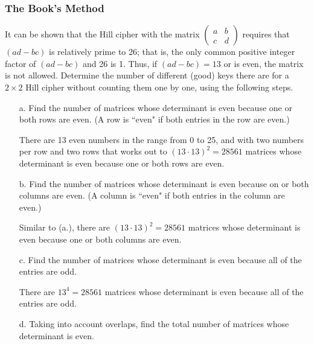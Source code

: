 \documentclass[12pt]{article}
\begin{document}
\subsubsection*{The Book's Method}
It can be shown that the Hill cipher with the matrix $\left(\begin{matrix} a & b \\ c & d\end{matrix}\right)$ requires that $\left(ad - bc\right)$ is relatively prime to 26; that is, the only common positive integer factor of $\left(ad - bc\right)$ and 26 is 1. Thus, if $\left(ad - bc\right) = 13$ or is even, the matrix is not allowed. Determine the number of different (good) keys there are for a $2 \times 2$ Hill cipher without counting them one by one, using the following steps.
\begin{itemize}
\item[a.] Find the number of matrices whose determinant is even because one or both rows are even. (A row is ``even" if both entries in the row are even.)

There are 13 even numbers in the range from 0 to 25, and with two numbers per row and two rows that works out to $\left(13 \cdot 13\right)^2 = 28561$ matrices whose determinant is even because one or both rows are even.

\item[b.] Find the number of matrices whose determinant is even because on or both columns are even. (A column is ``even" if both entries in the column are even.)

Similar to (a.), there are $\left(13 \cdot 13\right)^2 = 28561$ matrices whose determinant is even because one or both columns are even.

\item[c.] Find the number of matrices whose determinant is even because all of the entries are odd.

There are $13^4 = 28561$ matrices whose determinant is even because all of the entries are odd.

\item[d.] Taking into account overlaps, find the total number of matrices whose determinant is even.



\end{itemize}
\end{document}
